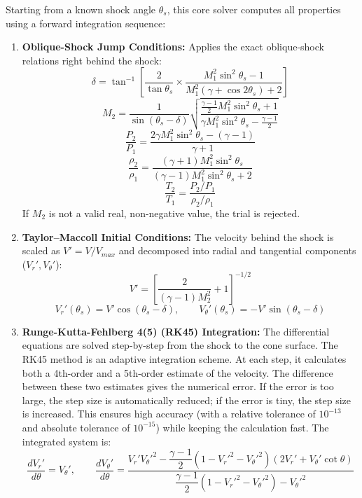 Starting from a known shock angle $\theta_s$, this core solver computes all properties using a forward integration sequence:
\begin{enumerate}
    \item \textbf{Oblique-Shock Jump Conditions:} Applies the exact oblique-shock relations right behind the shock:
    \begin{equation}
    \delta = \tan^{-1}\left[\frac{2}{\tan\theta_s}\times\frac{M_1^2\sin^2\theta_s-1}{M_1^2(\gamma+\cos2\theta_s)+2}\right]
    \end{equation}
    \begin{equation}
    M_2 = \frac{1}{\sin(\theta_s-\delta)}\sqrt{\frac{\frac{\gamma-1}{2}M_1^2\sin^2\theta_s+1}{\gamma M_1^2\sin^2\theta_s-\frac{\gamma-1}{2}}}
    \end{equation}
    \begin{equation}
    \frac{P_2}{P_1} = \frac{2\gamma M_1^2\sin^2\theta_s-(\gamma-1)}{\gamma+1}
    \end{equation}
    \begin{equation}
    \frac{\rho_2}{\rho_1} = \frac{(\gamma+1)M_1^2\sin^2\theta_s}{(\gamma-1)M_1^2\sin^2\theta_s+2}
    \end{equation}
    \begin{equation}
    \frac{T_2}{T_1} = \frac{P_2/P_1}{\rho_2/\rho_1}
    \end{equation}
    If $M_2$ is not a valid real, non-negative value, the trial is rejected.

    \item \textbf{Taylor--Maccoll Initial Conditions:} The velocity behind the shock is scaled as $V' = V/V_{max}$ and decomposed into radial and tangential components ($V_r', V_\theta'$):
    \begin{equation}
    V' = \left[\frac{2}{(\gamma-1)M_2^2}+1\right]^{-1/2}
    \end{equation}
    \begin{equation}
    V_r'(\theta_s) = V'\cos(\theta_s-\delta), \qquad V_\theta'(\theta_s) = -V'\sin(\theta_s-\delta)
    \end{equation}

    \item \textbf{Runge-Kutta-Fehlberg 4(5) (RK45) Integration:} The differential equations are solved step-by-step from the shock to the cone surface. The RK45 method is an adaptive integration scheme. At each step, it calculates both a 4th-order and a 5th-order estimate of the velocity. The difference between these two estimates gives the numerical error. If the error is too large, the step size is automatically reduced; if the error is tiny, the step size is increased. This ensures high accuracy (with a relative tolerance of $10^{-13}$ and absolute tolerance of $10^{-15}$) while keeping the calculation fast. The integrated system is:
    \begin{equation}
    \frac{dV_r'}{d\theta} = V_\theta', \qquad
    \frac{dV_\theta'}{d\theta} = \frac{V_r'V_\theta'^2 - \dfrac{\gamma-1}{2}(1-V_r'^2-V_\theta'^2)\left(2V_r'+V_\theta'\cot\theta\right)}{\dfrac{\gamma-1}{2}(1-V_r'^2-V_\theta'^2) - V_\theta'^2}
    \end{equation}


\end{enumerate}
